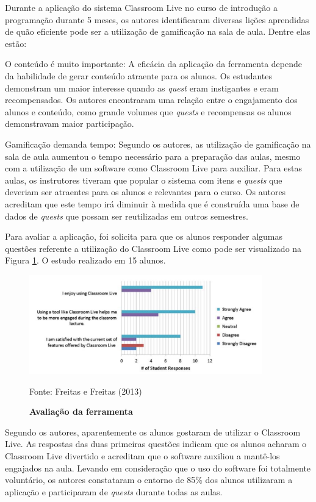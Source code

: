 \documentclass[
	12pt,				%
	oneside,			%
	a4paper,			%
	english,			%
	french,				%
	spanish,			%
	brazil,				%
	]{abntex2}
\begin{document}
Durante a aplicação do sistema Classroom Live no curso de introdução a programação durante 5 meses, os autores identificaram diversas lições aprendidas de quão eficiente pode ser a utilização de gamificação na sala de aula. Dentre elas estão:

O conteúdo é muito importante: A eficácia da aplicação da ferramenta depende da habilidade de gerar conteúdo atraente para os alunos. Os estudantes demonstram um maior interesse quando as \textit{quest} eram instigantes e eram recompensados. Os autores encontraram uma relação entre o engajamento dos alunos e conteúdo, como grande volumes que \textit{quests} e recompensas os alunos demonstravam maior participação.

Gamificação demanda tempo: Segundo os autores, as utilização de gamificação na sala de aula aumentou o tempo necessário para a preparação das aulas, mesmo com a utilização de um software como Classroom Live para auxiliar. Para estas aulas, os instrutores tiveram que popular o sistema com itens e \textit{quests} que deveriam ser atraentes para os alunos e relevantes para o curso. Os autores acreditam que este tempo irá diminuir à medida que é construída uma base de dados de \textit{quests} que possam ser reutilizadas em outros semestres.

Para avaliar a aplicação, foi solicita para que os alunos responder algumas questões referente a utilização do Classroom Live como pode ser visualizado na Figura \ref{fig:classroom_avaliacao}. O estudo realizado em 15 alunos.

\begin{figure}[ht]
\centering
\caption{\textbf{Avaliação da ferramenta}}
\includegraphics[width=0.9\textwidth]{imagens/classroom_avaliacao.png}

Fonte: Freitas e Freitas (2013)
\label{fig:classroom_avaliacao}
\end{figure}

Segundo os autores, aparentemente os alunos gostaram de utilizar o Classroom Live. As respostas das duas primeiras questões indicam que os alunos acharam o Classroom Live divertido e acreditam que o software auxiliou a mantê-los engajados na aula. Levando em consideração que o uso do software foi totalmente voluntário, os autores constataram o entorno de 85\% dos alunos utilizaram a aplicação e participaram de \textit{quests} durante todas as aulas. 
\end{document}
